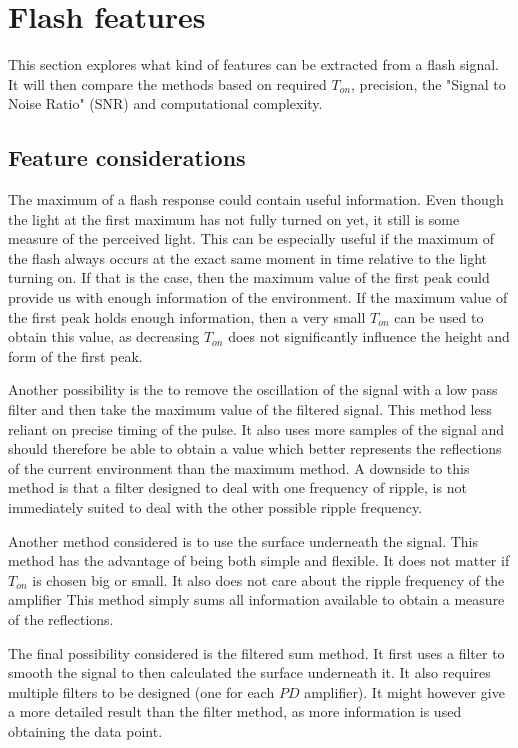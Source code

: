 \section{Flash features}
This section explores what kind of features can be extracted from a flash signal. It will then compare the methods based on required $T_{on}$, precision, the "Signal to Noise Ratio" (SNR) and computational complexity.

\subsection{Feature considerations}
The maximum of a flash response could contain useful information. Even though the light at the first maximum has not fully turned on yet, it still is some measure of the perceived light. This can be especially useful if the maximum of the flash always occurs at the exact same moment in time relative to the light turning on. If that is the case, then the maximum value of the first peak could provide us with enough information of the environment. If the maximum value of the first peak holds enough information, then a very small $T_{on}$ can be used to obtain this value, as decreasing $T_{on}$ does not significantly influence the height and form of the first peak.

Another possibility is the to remove the oscillation of the signal with a low pass filter and then take the maximum value of the filtered signal. This method less reliant on precise timing of the pulse. It also uses more samples of the signal and should therefore be able to obtain a value which better represents the reflections of the current environment than the maximum method. A downside to this method is that a filter designed to deal with one frequency of ripple, is not immediately suited to deal with the other possible ripple frequency.

Another method considered is to use the surface underneath the signal. This method has the advantage of being both simple and flexible. It does not matter if $T_{on}$ is chosen big or small. It also does not care about the ripple frequency of the amplifier This method simply sums all information available to obtain a measure of the reflections.

The final possibility considered is the filtered sum method. It first uses a filter to smooth the signal to then calculated the surface underneath it. It also requires multiple filters to be designed (one for each $PD$ amplifier). It might however give a more detailed result than the filter method, as more information is used obtaining the data point.

